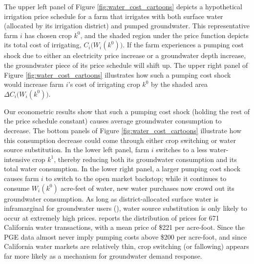 The upper left panel of Figure \ref{fig:water_cost_cartoons} depicts a hypothetical irrigation price schedule for a farm that irrigates with both surface water (allocated by its irrigation district) and pumped groundwater. This representative farm $i$ has chosen crop $k^0$, and the shaded region under the price function depicts its total cost of irrigating, $C_i\big(W_i(k^0)\big)$. If the farm experiences a pumping cost shock due to either an electricity price increase or a groundwater depth increase, the groundwater piece of its price schedule will shift up. The upper right panel of Figure \ref{fig:water_cost_cartoons} illustrates how such a pumping cost shock would increase farm $i$'s cost of irrigating crop $k^0$ by the shaded area $\Delta C_i\big(W_i(k^0)\big)$. 

Our econometric results show that such a pumping cost shock (holding the rest of the price schedule constant) causes average groundwater consumption to decrease. The bottom panels of Figure \ref{fig:water_cost_cartoons} illustrate how this consumption decrease could come through either crop switching or water source substitution. In the lower left panel, farm $i$ switches to a less water-intensive crop $k^1$, thereby reducing both its groundwater consumption and its total water consumption. In the lower right panel,  a larger  pumping cost shock causes farm $i$ to switch to the open market backstop; while it continues to consume $W_i(k^0)$ acre-feet of water, new water purchases now crowd out its groundwater consumption. As long as district-allocated surface water is inframarginal for groundwater users (\textcite{hagerty2019}), water source substitution is only likely to occur at extremely high prices. \textcite{hagerty2018} reports the distribution of prices for 671 California water transactions, with a mean price of \$221 per acre-foot. Since the PGE data almost never imply pumping costs above \$200 per acre-foot, and since California water markets are relatively thin, crop switching (or fallowing) appears far more likely as a mechanism for groundwater demand response.


